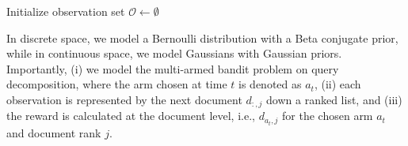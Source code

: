

\begin{algorithm}[!t]
\footnotesize
\caption{Thompson Sampling in Discrete Space}
\label{tab:thompson_discrete_space}

\BlankLine


Initialize observation set $\mathcal{O} \gets \emptyset$\;

\end{algorithm}


In discrete space, we model a Bernoulli distribution with a Beta conjugate prior, while in continuous space, we model Gaussians with Gaussian priors. Importantly, (i) we model the multi-armed bandit problem on query decomposition, where the arm chosen at time \(t\) is denoted as \(a_t\), (ii) each observation is represented by the next document \(d_{:,j}\) down a ranked list,
and (iii) the reward is calculated at the document level, i.e., \(d_{{a_t}, j}\) for the chosen arm \(a_t\) and document rank \(j\). 

